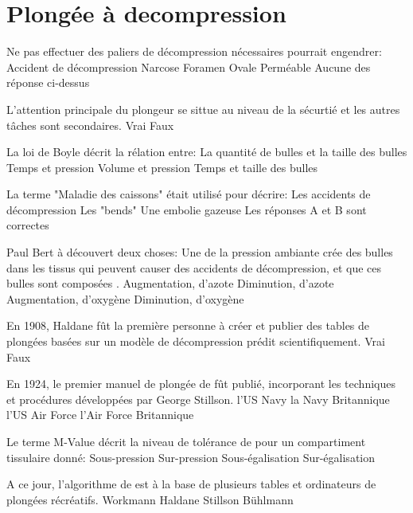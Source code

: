 \documentclass[english,12pt,a4paper]{article}
\newcommand{\tdi}{/Users/chrisbraissant/Documents/_Diving/_TDI-SDI/Graphics/Full_Logo/TDI_Letter}
\begin{document}
	\renewcommand{\footrulewidth}{1pt}
	\renewcommand{\headrulewidth}{1pt}

	\chead{}

	\cfoot{}
	\rfoot{\thepage}

	\section{Plongée à decompression}

	\begin{outline}
		\1 Ne pas effectuer des paliers de décompression nécessaires pourrait engendrer:
			\2 Accident de décompression
			\2 Narcose
			\2 Foramen Ovale Perméable
			\2 Aucune des réponse ci-dessus

		\1 L'attention principale du plongeur se sittue au niveau de la sécurtié et les autres tâches sont secondaires.
			\2 Vrai
			\2 Faux

		\1 La loi de Boyle décrit la rélation entre:
			\2 La quantité de bulles et la taille des bulles
			\2 Temps et pression
			\2 Volume et pression
			\2 Temps et taille des bulles

		\1 La terme "Maladie des caissons" était utilisé pour décrire:
			\2 Les accidents de décompression
			\2 Les "bends"
			\2 Une embolie gazeuse
			\2 Les réponses A et B sont correctes

		\1 Paul Bert à découvert deux choses: Une \underline{\hspace{1.5cm}} de la pression ambiante crée des bulles dans les tissus qui peuvent causer des accidents de décompression, et que ces bulles sont composées \underline{\hspace{1.5cm}}.
			\2 Augmentation, d'azote
			\2 Diminution, d'azote
			\2 Augmentation, d'oxygène
			\2 Diminution, d'oxygène

		\1 En 1908, Haldane fût la première personne à créer et publier des tables de plongées basées sur un modèle de décompression prédit scientifiquement.
			\2 Vrai
			\2 Faux

		\1 En 1924, le premier manuel de plongée de \underline{\hspace{1.5cm}} fût publié, incorporant les techniques et procédures développées par George Stillson.
			\2 l'US Navy
			\2 la Navy Britannique
			\2 l'US Air Force
			\2 l'Air Force Britannique

		\1 Le terme M-Value décrit la niveau de tolérance de \underline{\hspace{1.5cm}} pour un compartiment tissulaire donné:
			\2 Sous-pression
			\2 Sur-pression
			\2 Sous-égalisation
			\2 Sur-égalisation

		\1 A ce jour, l'algorithme de \underline{\hspace{1.5cm}} est à la base de plusieurs tables et ordinateurs de plongées récréatifs.
			\2 Workmann
			\2 Haldane
			\2 Stillson
			\2 Bühlmann
	\end{outline}
\end{document}
